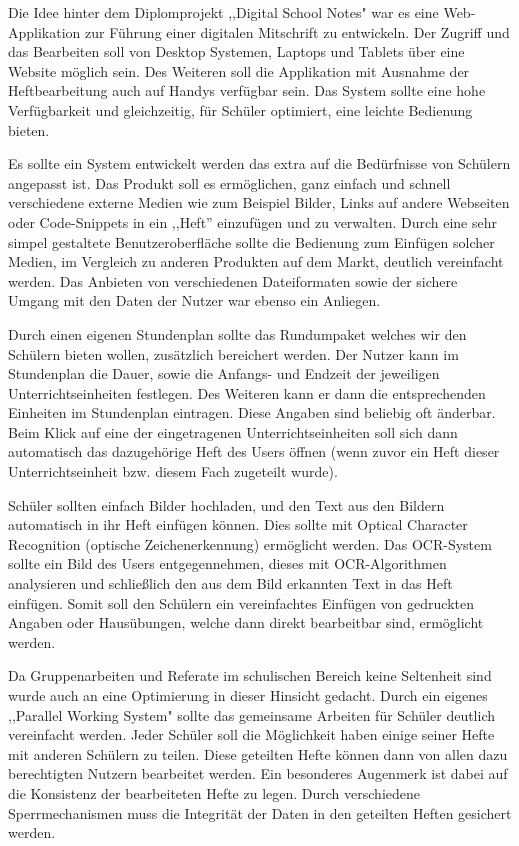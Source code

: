 Die Idee hinter dem Diplomprojekt ,,Digital School Notes" war es eine Web-Applikation zur Führung einer digitalen Mitschrift zu entwickeln. Der Zugriff und das Bearbeiten soll von Desktop Systemen, Laptops und Tablets über eine Website möglich sein. Des Weiteren soll die Applikation mit Ausnahme der Heftbearbeitung auch auf Handys verfügbar sein. Das System sollte eine hohe Verfügbarkeit und gleichzeitig, für Schüler optimiert, eine leichte Bedienung bieten. 

Es sollte ein System entwickelt werden das extra auf die Bedürfnisse von Schülern angepasst ist. Das Produkt soll es ermöglichen, ganz einfach und schnell verschiedene externe Medien wie zum Beispiel Bilder, Links auf andere Webseiten oder Code-Snippets in ein ,,Heft'' einzufügen und zu verwalten. Durch eine sehr simpel gestaltete Benutzeroberfläche sollte die Bedienung zum Einfügen solcher Medien, im Vergleich zu anderen Produkten auf dem Markt, deutlich vereinfacht werden. Das Anbieten von verschiedenen Dateiformaten sowie der sichere Umgang mit den Daten der Nutzer war ebenso ein Anliegen.

Durch einen eigenen Stundenplan sollte das Rundumpaket welches wir den Schülern bieten wollen, zusätzlich bereichert werden. Der Nutzer kann im Stundenplan die Dauer, sowie die Anfangs- und Endzeit der jeweiligen Unterrichtseinheiten festlegen. Des Weiteren kann er dann die entsprechenden Einheiten im Stundenplan eintragen. Diese Angaben sind beliebig oft änderbar. Beim Klick auf eine der eingetragenen Unterrichtseinheiten soll sich dann automatisch das dazugehörige Heft des Users öffnen (wenn zuvor ein Heft dieser Unterrichtseinheit bzw. diesem Fach zugeteilt wurde).

Schüler sollten einfach Bilder hochladen, und den Text aus den Bildern automatisch in ihr Heft einfügen können. Dies sollte mit Optical Character Recognition (optische Zeichenerkennung) ermöglicht werden. Das OCR-System sollte ein Bild des Users entgegennehmen, dieses mit OCR-Algorithmen analysieren und schließlich den aus dem Bild erkannten Text in das Heft einfügen. Somit soll den Schülern ein vereinfachtes Einfügen von gedruckten Angaben oder Hausübungen, welche dann direkt bearbeitbar sind, ermöglicht werden.

Da Gruppenarbeiten und Referate im schulischen Bereich keine Seltenheit sind wurde auch an eine Optimierung in dieser Hinsicht gedacht. Durch ein eigenes ,,Parallel Working System" sollte das gemeinsame Arbeiten für Schüler deutlich vereinfacht werden. Jeder Schüler soll die Möglichkeit haben einige seiner Hefte mit anderen Schülern zu teilen. Diese geteilten Hefte können dann von allen dazu berechtigten Nutzern bearbeitet werden. Ein besonderes Augenmerk ist dabei auf die Konsistenz der bearbeiteten Hefte zu legen. Durch verschiedene Sperrmechanismen muss die Integrität der Daten in den geteilten Heften gesichert werden.

